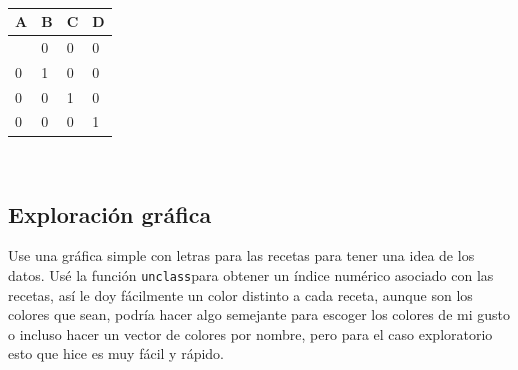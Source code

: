 \documentclass[
  letterpaper,
  DIV=11,
  numbers=noendperiod]{scrartcl}
\newenvironment{Shaded}{\begin{snugshade}}{\end{snugshade}}
\newcommand{\AttributeTok}[1]{\textcolor[rgb]{0.40,0.45,0.13}{#1}}
\newcommand{\FunctionTok}[1]{\textcolor[rgb]{0.28,0.35,0.67}{#1}}
\newcommand{\NormalTok}[1]{\textcolor[rgb]{0.00,0.23,0.31}{#1}}
\newcommand{\SpecialCharTok}[1]{\textcolor[rgb]{0.37,0.37,0.37}{#1}}
\newcommand{\StringTok}[1]{\textcolor[rgb]{0.13,0.47,0.30}{#1}}
\begin{document}
\begin{table}

\caption{\label{tbl-dummy}Variables indicadoras derivadas del factor
\emph{receta}.}

\begin{minipage}{0.33\linewidth}
~\end{minipage}%
%
\begin{minipage}{0.33\linewidth}

\begin{longtable}[]{@{}llll@{}}
\toprule\noalign{}
A & B & C & D \\
\midrule\noalign{}
\endhead
\bottomrule\noalign{}
\endlastfoot
1 & 0 & 0 & 0 \\
0 & 1 & 0 & 0 \\
0 & 0 & 1 & 0 \\
0 & 0 & 0 & 1 \\
\end{longtable}

\end{minipage}%
%
\begin{minipage}{0.33\linewidth}
~\end{minipage}%

\end{table}%

\subsection{Exploración gráfica}\label{exploraciuxf3n-gruxe1fica}

Use una gráfica simple con letras para las recetas para tener una idea
de los datos. Usé la función \texttt{unclass}para obtener un índice
numérico asociado con las recetas, así le doy fácilmente un color
distinto a cada receta, aunque son los colores que sean, podría hacer
algo semejante para escoger los colores de mi gusto o incluso hacer un
vector de colores por nombre, pero para el caso exploratorio esto que
hice es muy fácil y rápido.

\begin{Shaded}
\end{Shaded}
\end{document}
